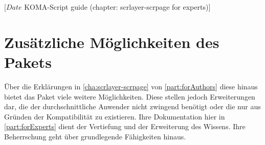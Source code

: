 %
%
%
%
%
%
%
%
% 
%
%
%
%

%
                 [$Date$
                  KOMA-Script guide (chapter: scrlayer-scrpage for experts)]

\chapter[{Zusätzliche Möglichkeiten von \Package{scrlayer-scrpage}}]
{Zusätzliche Möglichkeiten des
  Pakets
  }
%
\BeginIndexGroup
{}%
Über die Erklärungen in \autoref{cha:scrlayer-scrpage} von
\autoref{part:forAuthors} diese hinaus bietet
das Paket  viele weitere Möglichkeiten. Diese
stellen jedoch Erweiterungen dar, die der durchschnittliche Anwender
nicht zwingend benötigt oder die nur aus Gründen der Kompatibilität zu
 existieren. Ihre Dokumentation hier in
\autoref{part:forExperts} dient der Vertiefung und der Erweiterung des
Wissens. Ihre Beherrschung geht über grundlegende Fähigkeiten hinaus.

